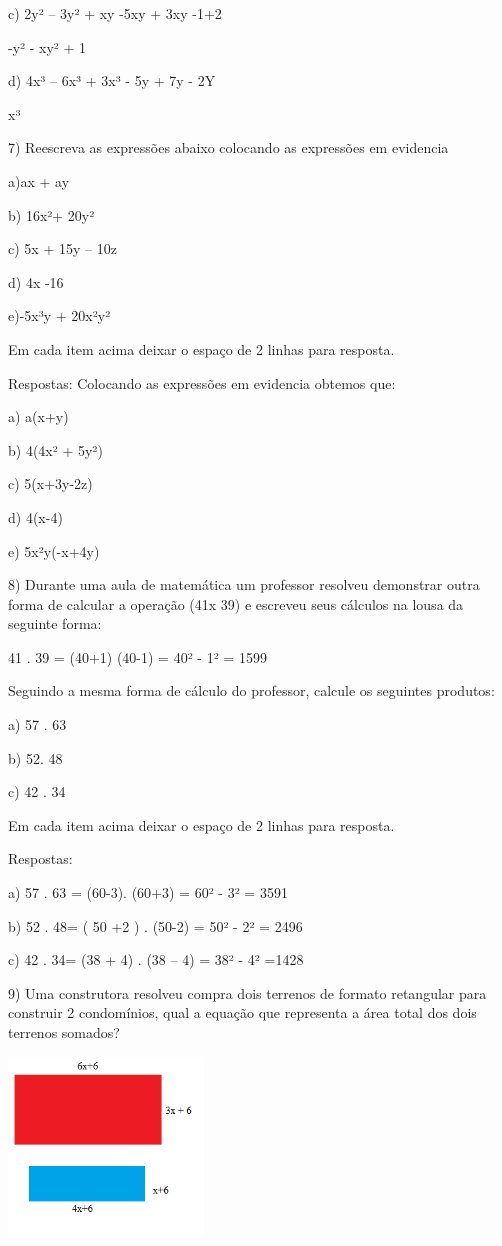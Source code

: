 c) 2y² -- 3y² + xy -5xy + 3xy -1+2

-y² - xy² + 1

d) 4x³ -- 6x³ + 3x³ - 5y + 7y - 2Y

x³

7) Reescreva as expressões abaixo colocando as expressões em evidencia

a)ax + ay

b) 16x²+ 20y²

c) 5x + 15y -- 10z

d) 4x -16

e)-5x³y + 20x²y²

Em cada item acima deixar o espaço de 2 linhas para resposta.

Respostas: Colocando as expressões em evidencia obtemos que:

a) a(x+y)

b) 4(4x² + 5y²)

c) 5(x+3y-2z)

d) 4(x-4)

e) 5x²y(-x+4y)

8) Durante uma aula de matemática um professor resolveu demonstrar outra
forma de calcular a operação (41x 39) e escreveu seus cálculos na lousa
da seguinte forma:

41 . 39 = (40+1) (40-1) = 40² - 1² = 1599

Seguindo a mesma forma de cálculo do professor, calcule os seguintes
produtos:

a) 57 . 63

b) 52. 48

c) 42 . 34

Em cada item acima deixar o espaço de 2 linhas para resposta.

Respostas:

a) 57 . 63 = (60-3). (60+3) = 60² - 3² = 3591

b) 52 . 48= ( 50 +2 ) . (50-2) = 50² - 2² = 2496

c) 42 . 34= (38 + 4) . (38 -- 4) = 38² - 4² =1428

9) Uma construtora resolveu compra dois terrenos de formato retangular
para construir 2 condomínios, qual a equação que representa a área total
dos dois terrenos somados?

\includegraphics[width=2.04167in,height=1.8873in]{./imgSAEB_8_MAT/media/image5.png}


